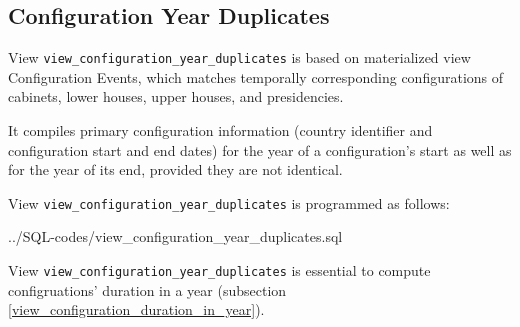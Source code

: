 \subsection{Configuration Year Duplicates}\label{view_configuration_year_duplicates}
View \texttt{\footnotesize view\_configuration\_year\_duplicates} is based on materialized view Configuration Events, which matches temporally corresponding configurations of cabinets, lower houses, upper houses, and presidencies.

It compiles primary configuration information (country identifier and configuration start and end dates) for the year of a configuration's start as well as for the year of its end, provided they are not identical. 

View \texttt{\footnotesize view\_configuration\_year\_duplicates} is programmed as follows: 

%
{../SQL-codes/view_configuration_year_duplicates.sql}

View \texttt{\footnotesize view\_configuration\_year\_duplicates} is essential to compute configruations' duration in a year (subsection \ref{view_configuration_duration_in_year}).

 







